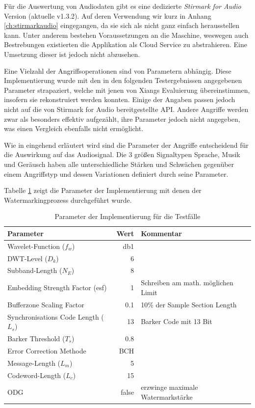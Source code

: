 Für die Auswertung von Audiodaten gibt es eine dedizierte \textit{Stirmark for Audio} Version\cite{stirmarkforaudio} (aktuelle v1.3.2). Auf deren Verwendung wir kurz in Anhang \ref{ch:stirmarkaudio} eingegangen, da sie sich als nicht ganz einfach herausstellen kann. Unter anderem bestehen Voraussetzungen an die Maschine, weswegen auch Bestrebungen existierten die Applikation als Cloud Service zu abstrahieren\cite{petitcolas2001public}. Eine Umsetzung dieser ist jedoch nicht abzusehen. 

Eine Vielzahl der Angriffsoperationen sind von Parametern abhängig. Diese Implementierung wurde mit den in den folgenden Testergebnissen angegebenen Parameter strapaziert, welche mit jenen von Xiangs Evaluierung\cite{xiang2007robust} übereinstimmen, insofern sie rekonstruiert werden konnten. Einige der Angaben passen jedoch nicht auf die von Stirmark for Audio bereitgestellte API. Andere Angriffe werden zwar als besonders effektiv aufgezählt, ihre Parameter jedoch nicht angegeben, was einen Vergleich ebenfalls nicht ermöglicht. 

Wie in \cite{lang2004stirmark} eingehend erläutert wird sind die Parameter der Angriffe entscheidend für die Auswirkung auf das Audiosignal. Die 3 größen Signaltypen Sprache, Musik und Geräusch haben alle unterschiedliche Stärken und Schwächen gegenüber einem Angriffstyp und dessen Variationen definiert durch seine Parameter. 

Tabelle \ref{tab:algo_settings} zeigt die Parameter der Implementierung mit denen der Watermarkingprozess durchgeführt wurde. 

\begin{table}[h]
\begin{tabular}{lrl}
\hline
\textbf{Parameter} 	 & \textbf{Wert} & \textbf{Kommentar} 	 \\ \hline
Wavelet-Function (${f}_{w}$)             & db1           & 	 \\
DWT-Level (${D}_{k}$) 	 & 6             & 	 \\
Subband-Length (${N}_{E}$)               & 8             & 	 \\
Embedding Strength Factor (esf)          & 1             & Schreiben am math. möglichen Limit       \\
Bufferzone Scaling Factor                & 0.1           & 10\% der Sample Section Length           \\
Synchronisations Code Length (${L}_{s}$) & 13            & Barker Code mit 13 Bit 	\\
Barker Threshold (${T}_{s}$)             & 0.8           & 	 \\
Error Correction Methode                 & BCH           & 	 \\
Message-Length (${L}_{m}$)               & 5             & 	 \\
Codeword-Length (${L}_{c}$)              & 15            & 	 \\
ODG 			 & false         & erzwinge maximale Watermarkstärke  		\\ \hline
 	 	
\end{tabular} 	
\caption{Parameter der Implementierung für die Testfälle}
\label{tab:algo_settings}
\end{table}	

